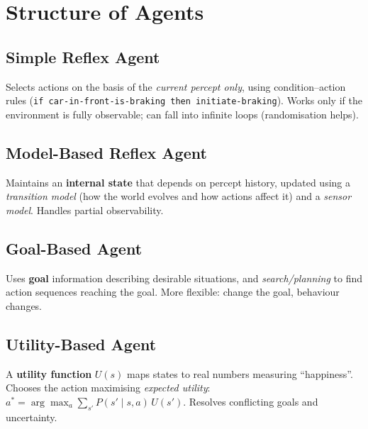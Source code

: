 \section{Structure of Agents}
\subsection{Simple Reflex Agent}
Selects actions on the basis of the \emph{current percept only}, using condition--action rules (\texttt{if car-in-front-is-braking then initiate-braking}). Works only if the environment is fully observable; can fall into infinite loops (randomisation helps).
\subsection{Model-Based Reflex Agent}
Maintains an \textbf{internal state} that depends on percept history, updated using a \emph{transition model} (how the world evolves and how actions affect it) and a \emph{sensor model}. Handles partial observability.
\subsection{Goal-Based Agent}
Uses \textbf{goal} information describing desirable situations, and \emph{search/planning} to find action sequences reaching the goal. More flexible: change the goal, behaviour changes.
\subsection{Utility-Based Agent}
A \textbf{utility function} $U(s)$ maps states to real numbers measuring ``happiness''. Chooses the action maximising \emph{expected utility}: $a^{*}=\arg\max_a \sum_{s'}P(s'\mid s,a)\,U(s')$. Resolves conflicting goals and uncertainty.
